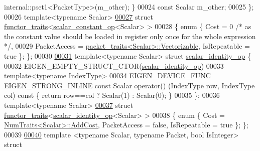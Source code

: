 \begin{DoxyCode}
      internal::pset1<PacketType>(m\_other); \}
00024   \textcolor{keyword}{const} Scalar m\_other;
00025 \};
00026 \textcolor{keyword}{template}<\textcolor{keyword}{typename} Scalar>
\hyperlink{struct_eigen_1_1internal_1_1functor__traits_3_01scalar__constant__op_3_01_scalar_01_4_01_4}{00027} \textcolor{keyword}{struct }\hyperlink{struct_eigen_1_1internal_1_1functor__traits}{functor\_traits}<\hyperlink{struct_eigen_1_1internal_1_1scalar__constant__op}{scalar\_constant\_op}<Scalar> >
00028 \{ \textcolor{keyword}{enum} \{ Cost = 0 \textcolor{comment}{/* as the constant value should be loaded in register only once for the whole expression 
      */},
00029          PacketAccess = \hyperlink{struct_eigen_1_1internal_1_1packet__traits}{packet\_traits<Scalar>::Vectorizable}, 
      IsRepeatable = \textcolor{keyword}{true} \}; \};
00030 
\hyperlink{struct_eigen_1_1internal_1_1scalar__identity__op}{00031} \textcolor{keyword}{template}<\textcolor{keyword}{typename} Scalar> \textcolor{keyword}{struct }\hyperlink{struct_eigen_1_1internal_1_1scalar__identity__op}{scalar\_identity\_op} \{
00032   EIGEN\_EMPTY\_STRUCT\_CTOR(\hyperlink{struct_eigen_1_1internal_1_1scalar__identity__op}{scalar\_identity\_op})
00033   \textcolor{keyword}{template}<\textcolor{keyword}{typename} IndexType>
00034   EIGEN\_DEVICE\_FUNC EIGEN\_STRONG\_INLINE \textcolor{keyword}{const} Scalar operator() (IndexType row, IndexType col)\textcolor{keyword}{ const }\{ \textcolor{keywordflow}{
      return} row==col ? Scalar(1) : Scalar(0); \}
00035 \};
00036 \textcolor{keyword}{template}<\textcolor{keyword}{typename} Scalar>
\hyperlink{struct_eigen_1_1internal_1_1functor__traits_3_01scalar__identity__op_3_01_scalar_01_4_01_4}{00037} \textcolor{keyword}{struct }\hyperlink{struct_eigen_1_1internal_1_1functor__traits}{functor\_traits}<\hyperlink{struct_eigen_1_1internal_1_1scalar__identity__op}{scalar\_identity\_op}<Scalar> >
00038 \{ \textcolor{keyword}{enum} \{ Cost = \hyperlink{group___core___module_struct_eigen_1_1_num_traits}{NumTraits<Scalar>::AddCost}, PacketAccess = \textcolor{keyword}{false}, IsRepeatable = \textcolor{keyword}{
      true} \}; \};
00039 
\hyperlink{struct_eigen_1_1internal_1_1linspaced__op__impl}{00040} \textcolor{keyword}{template} <\textcolor{keyword}{typename} Scalar, \textcolor{keyword}{typename} Packet, \textcolor{keywordtype}{bool} IsInteger> \textcolor{keyword}{struct }

\end{DoxyCode}
